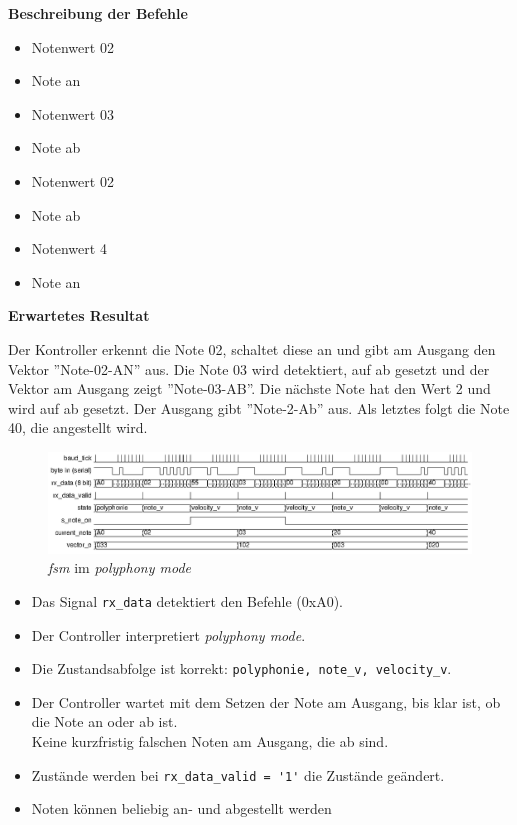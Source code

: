 \textbf{Beschreibung der Befehle}

\begin{itemize}
\item Notenwert 02
\item Note an
\item Notenwert 03
\item Note ab
\item Notenwert 02
\item Note ab
\item Notenwert 4
\item Note an
\end{itemize}

\textbf{Erwartetes Resultat}

Der Kontroller erkennt die Note 02, schaltet diese an und gibt am Ausgang den Vektor ''Note-02-AN'' aus. Die Note 03 wird detektiert, auf ab gesetzt und der Vektor am Ausgang zeigt ''Note-03-AB''. Die nächste Note hat den Wert 2 und wird auf ab gesetzt. Der Ausgang gibt ''Note-2-Ab'' aus. Als letztes folgt die Note 40, die angestellt wird.

\begin{figure}[H]
	\includegraphics[width=1\textwidth]{images/midi_control/wave_polyphonie.png}
	\caption{\textit{fsm} im \textit{polyphony mode}}
	\label{fig.midicontrol_polyphonie}
\end{figure}

\begin{itemize}
	\item Das Signal \lstinline|rx_data| detektiert den Befehle (0xA0).
	\item Der Controller interpretiert  \textit{polyphony mode}. 
	\item Die Zustandsabfolge ist korrekt: \lstinline|polyphonie, note_v, velocity_v|.
	\item Der Controller wartet mit dem Setzen der Note am Ausgang, bis klar ist, ob die Note an oder ab ist.\\
	Keine kurzfristig falschen Noten am Ausgang, die ab sind.
	\item Zustände werden bei \lstinline|rx_data_valid = '1'| die Zustände geändert.
	\item Noten können beliebig an- und abgestellt werden
\end{itemize}

